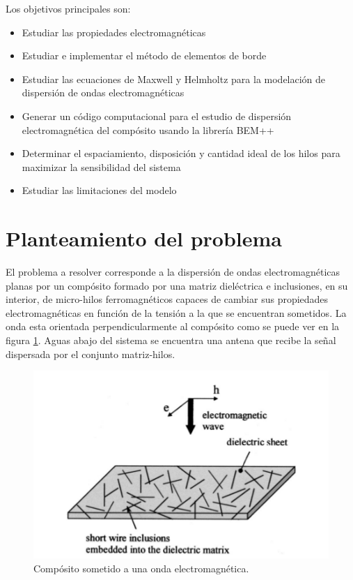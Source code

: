 \documentclass[12pt,letterpaper]{article}
\numberwithin{equation}{section}
\begin{document}
Los objetivos principales son:

\begin{itemize}
	\item Estudiar las propiedades electromagnéticas
	\item Estudiar e implementar el método de elementos de borde
	\item Estudiar las ecuaciones de Maxwell y Helmholtz para la modelación de dispersión de ondas electromagnéticas
	\item Generar un código computacional para el estudio de dispersión electromagnética del compósito usando la librería BEM++
	\item Determinar el espaciamiento, disposición y cantidad ideal de los hilos para maximizar la sensibilidad del sistema
	\item Estudiar las limitaciones del modelo
\end{itemize}

\pagebreak
\section{Planteamiento del problema}
El problema a resolver corresponde a la dispersión de ondas electromagnéticas planas por un compósito formado por una matriz dieléctrica e inclusiones, en su interior, de micro-hilos ferromagnéticos capaces de cambiar sus propiedades electromagnéticas en función de la tensión a la que se encuentran sometidos. La onda esta orientada perpendicularmente al compósito como se puede ver en la figura \ref{fig: composito}. Aguas abajo del sistema se encuentra una antena que recibe la señal dispersada por el conjunto matriz-hilos.

\begin{figure}[H]
	\centering\includegraphics[scale=0.6]{Imagenes/composito.png}
	\caption{Compósito sometido a una onda electromagnética.}
	\label{fig: composito}
\end{figure} 
\end{document}
